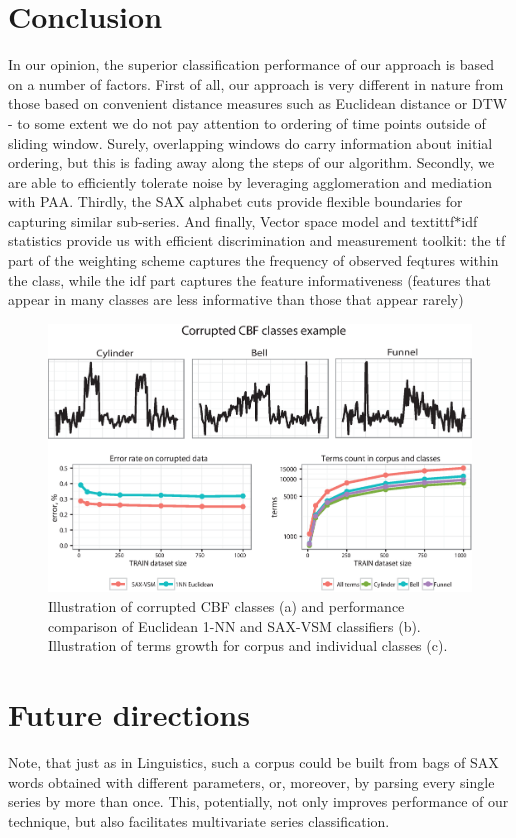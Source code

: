 \documentclass{llncs}
\begin{document}
\section{Conclusion}
In our opinion, the superior classification performance of our approach is based on 
a number of factors. 
First of all, our approach is very different in nature from those 
based on convenient distance measures such as Euclidean distance or DTW - to some 
extent we do not pay attention to ordering of time points outside of sliding window. 
Surely, overlapping windows do carry information about initial ordering, but this 
is fading away along the steps of our algorithm.
Secondly, we are able to efficiently tolerate noise by leveraging agglomeration 
and mediation with PAA. 
Thirdly, the SAX alphabet cuts provide flexible boundaries for capturing similar 
sub-series. 
And finally, Vector space model and textit{tf$\ast$idf} statistics provide us 
with efficient discrimination and measurement toolkit: the tf part of the weighting scheme
captures the frequency of observed feqtures within the class, while the idf part 
captures the feature informativeness (features that appear in many classes 
are less informative than those that appear rarely)

\begin{figure}[tbp]
   \centering
   \includegraphics[width=120mm]{figures/corrupted.eps}
   \caption{Illustration of corrupted CBF classes (a) and performance comparison of Euclidean
1-NN and SAX-VSM classifiers (b). Illustration of terms growth for corpus and individual
classes (c).}
   \label{fig:corrupted}
\end{figure}

\section{Future directions}
Note, that just as in Linguistics, such a corpus could be built from bags of SAX words obtained with
different parameters, or, moreover, by parsing every single series by more than once. This,
potentially, not only improves performance of our technique, but also facilitates multivariate
series classification.
\end{document}
